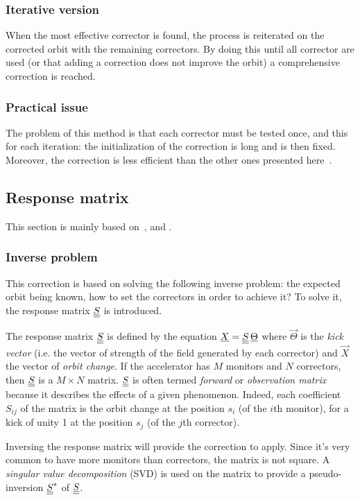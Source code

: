 \subsubsection{Iterative version}
When the most effective corrector is found, the process is reiterated on the corrected orbit with the remaining correctors. By doing this until all corrector are used (or that adding a correction does not improve the orbit) a comprehensive correction is reached.

\subsubsection{Practical issue}
The problem of this method is that each corrector must be tested once, and this for each iteration: the initialization of the correction is long and is then fixed. Moreover, the correction is less efficient than the other ones presented here~\cite{book:wille}.

\subsection{Response matrix}
\label{sec:response_matrix}
This section is mainly based on~\cite{book:wille}, \cite{art:decker-1991} and \cite{art:plouviez-1999}.

\subsubsection{Inverse problem}
This correction is based on solving the following inverse problem: the expected orbit being known, how to set the correctors in order to achieve it? To solve it, the response matrix $\underline{\underline{S}}$ is introduced.

The response matrix $\underline{\underline{S}}$ is defined by the equation $\underline{X} = \underline{\underline{S}}\, \underline{\Theta}$ where $\vec{\Theta}$ is the \emph{kick vector} (i.e. the vector of strength of the field generated by each corrector) and $\vec{X}$ the vector of \emph{orbit change}. If the accelerator has $M$ monitors and $N$ correctors, then $\underline{\underline{S}}$ is a $M \times N$ matrix. $\underline{\underline{S}}$ is often termed \emph{forward} or \emph{observation matrix} because it describes the effects of a given phenomenon. Indeed, each coefficient $S_{ij}$ of the matrix is the orbit change at the position $s_i$ (of the $i$th monitor), for a kick of unity 1 at the position $s_j$ (of the $j$th corrector).

Inversing the response matrix will provide the correction to apply. Since it's very common to have more monitors than correctors, the matrix is not square. A \emph{singular value decomposition} (SVD) is used on the matrix to provide a pseudo-inversion $\underline{\underline{S}}^*$ of $\underline{\underline{S}}$.

